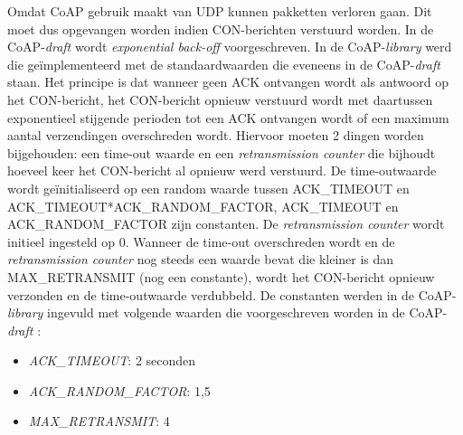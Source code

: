 Omdat CoAP gebruik maakt van UDP kunnen pakketten verloren gaan. Dit moet dus opgevangen worden indien CON-berichten verstuurd worden. In de CoAP-\textit{draft} \cite{coapDraft} wordt \textit{exponential back-off} voorgeschreven. In de CoAP-\textit{library} werd die ge\"{i}mplementeerd met de standaardwaarden die eveneens in de CoAP-\textit{draft} \cite{coapDraft} staan. Het principe is dat wanneer geen ACK ontvangen wordt als antwoord op het CON-bericht, het CON-bericht opnieuw verstuurd wordt met daartussen exponentieel stijgende perioden tot een ACK ontvangen wordt of een maximum aantal verzendingen overschreden wordt. Hiervoor moeten 2 dingen worden bijgehouden: een time-out waarde en een \textit{retransmission counter} die bijhoudt hoeveel keer het CON-bericht al opnieuw werd verstuurd. De time-outwaarde wordt ge\"{i}nitialiseerd op een random waarde tussen ACK\_TIMEOUT en ACK\_TIMEOUT*ACK\_RANDOM\_FACTOR, ACK\_TIMEOUT en ACK\_RANDOM\_FACTOR zijn constanten. De \textit{retransmission counter} wordt initieel ingesteld op 0. Wanneer de time-out overschreden wordt en de \textit{retransmission counter} nog steeds een waarde bevat die kleiner is dan MAX\_RETRANSMIT (nog een constante), wordt het CON-bericht opnieuw verzonden en de time-outwaarde verdubbeld. De constanten werden in de CoAP-\textit{library} ingevuld met volgende waarden die voorgeschreven worden in de CoAP-\textit{draft}  \cite{coapDraft}:
\begin{itemize}
\item \textit{ACK\_TIMEOUT}: 2 seconden
\item \textit{ACK\_RANDOM\_FACTOR}: 1,5
\item \textit{MAX\_RETRANSMIT}: 4
\end{itemize}
